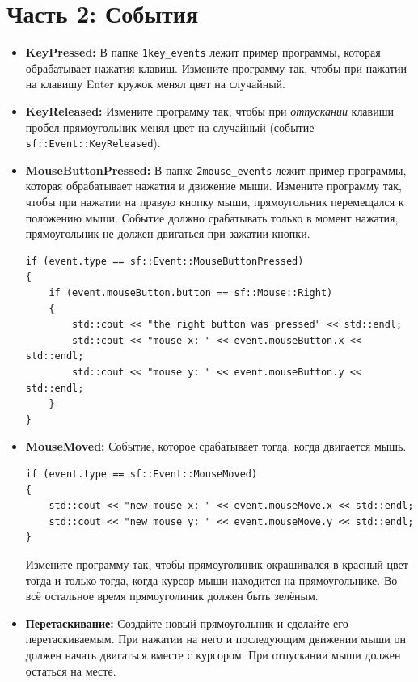 \documentclass{article}
\begin{document}
\newpage

\section*{Часть 2: События}
\begin{itemize}

\item \textbf{KeyPressed:} В папке \texttt{1key\_events} лежит пример программы, которая обрабатывает нажатия клавиш. Измените программу так, чтобы при нажатии на клавишу Enter кружок менял цвет на случайный.

\item \textbf{KeyReleased:} Измените программу так, чтобы при \textit{отпускании} клавиши пробел прямоугольник менял цвет на случайный (событие \texttt{sf::Event::KeyReleased}).

\item \textbf{MouseButtonPressed:} В папке \texttt{2mouse\_events} лежит пример программы, которая обрабатывает нажатия и движение мыши. Измените программу так, чтобы при нажатии на правую кнопку мыши, прямоугольник перемещался к положению мыши. Событие должно срабатывать только в момент нажатия, прямоугольник не должен двигаться при зажатии кнопки.
\begin{lstlisting}
if (event.type == sf::Event::MouseButtonPressed)
{
    if (event.mouseButton.button == sf::Mouse::Right)
    {
        std::cout << "the right button was pressed" << std::endl;
        std::cout << "mouse x: " << event.mouseButton.x << std::endl;
        std::cout << "mouse y: " << event.mouseButton.y << std::endl;
    }
}
\end{lstlisting}


\item \textbf{MouseMoved:} Событие, которое срабатывает тогда, когда двигается мышь.
\begin{lstlisting}
if (event.type == sf::Event::MouseMoved)
{
    std::cout << "new mouse x: " << event.mouseMove.x << std::endl;
    std::cout << "new mouse y: " << event.mouseMove.y << std::endl;
}
\end{lstlisting}
Измените программу так, чтобы прямоуголиник окрашивался в красный цвет тогда и только тогда, когда курсор мыши находится на прямоугольнике. Во всё остальное время прямоуголиник должен быть зелёным.

\item \textbf{Перетаскивание:} Создайте новый прямоугольник и сделайте его перетаскиваемым. При нажатии на него и последующим движении мыши он должен начать двигаться вместе с курсором. При отпускании мыши должен остаться на месте.



\end{itemize}
\end{document}
